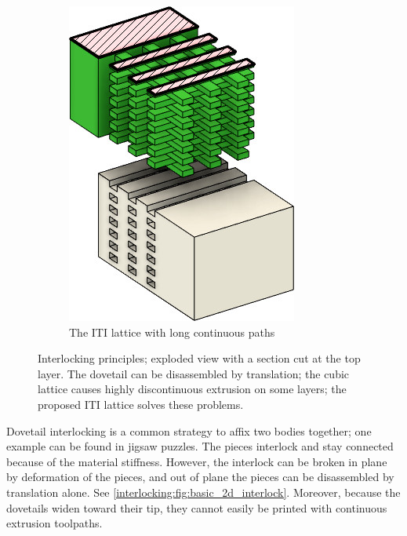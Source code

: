 \begin{figure}
\begin{subfigure}[B]{.36\columnwidth}
		\includegraphics[height=\figheight]{sources-method-basic_lattice.jpg}
		\caption{The ITI lattice with long continuous paths}
		\label{interlocking:fig:basic_structure_single_mat}
	\end{subfigure}
	\caption{Interlocking principles; exploded view with a section cut at the top layer. The dovetail can be disassembled by translation; the cubic lattice causes highly discontinuous extrusion on some layers; the proposed ITI lattice solves these problems.}
	\label{interlocking:fig:basic_structure}
\end{figure}





Dovetail interlocking is a common strategy to affix two bodies together;
one example can be found in jigsaw puzzles.
The pieces interlock and stay connected because of the material stiffness.
However, the interlock can be broken in plane by deformation of the pieces,
and out of plane the pieces can be disassembled by translation alone.
See \cref{interlocking:fig:basic_2d_interlock}.
Moreover, because the dovetails widen toward their tip, they cannot easily be printed with continuous extrusion toolpaths.


